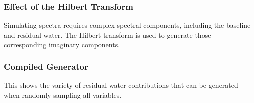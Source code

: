 \documentclass[AMA,LATO1COL]{WileyNJD-v2}
\begin{document}
\subsubsection{Effect of the Hilbert Transform}\label{reswater:effect-of-the-hilbert-transform}%
Simulating spectra requires complex spectral components, including the baseline and residual water. The Hilbert transform is used to generate those corresponding imaginary components. 

    \begin{center}
    \end{center}


    
\subsubsection{Compiled Generator}\label{reswater:compiled-generator}\raggedright
This shows the variety of residual water contributions that can be generated when randomly sampling all variables.

    \begin{center}
    \end{center}
    { \hspace*{\fill} \\}
    

    
\end{document}
